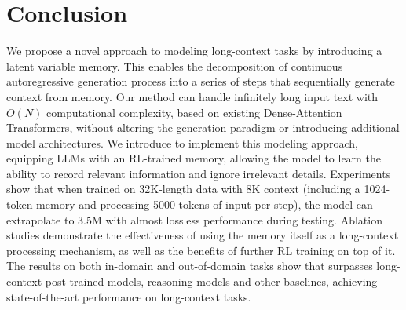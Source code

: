 \section{Conclusion}
We propose a novel approach to modeling long-context tasks by introducing a latent variable memory. This enables the decomposition of continuous autoregressive generation process into a series of steps that sequentially generate context from memory. Our method can handle infinitely long input text with  $O(N)$ computational complexity, based on existing Dense-Attention Transformers, without altering the generation paradigm or introducing additional model architectures. We introduce \method to implement this modeling approach, equipping LLMs with an RL-trained memory, allowing the model to learn the ability to record relevant information and ignore irrelevant details.  Experiments show that when trained on 32K-length data with 8K context (including a 1024-token memory and processing 5000 tokens of input per step), the model can extrapolate to 3.5M with almost lossless performance during testing. Ablation studies demonstrate the effectiveness of using the memory itself as a long-context processing mechanism, as well as the benefits of further RL training on top of it. The results on both in-domain and out-of-domain tasks show that \method surpasses long-context post-trained models, reasoning models and other baselines, achieving state-of-the-art performance on long-context tasks.

